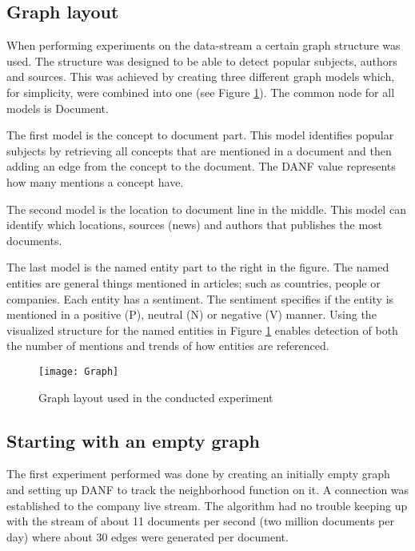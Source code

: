 \subsection{Graph layout}

When performing experiments on the data-stream a certain graph structure was used. The structure was designed to be able to detect popular subjects, authors and sources. This was achieved by creating three different graph models which, for simplicity, were combined into one (see Figure \ref{fig:experiment-graph}). The common node for all models is Document. 

The first model is the concept to document part. This model identifies popular subjects by retrieving all concepts that are mentioned in a document and then adding an edge from the concept to the document. The DANF value represents how many mentions a concept have. 

The second model is the location to document line in the middle. This model can identify which locations, sources (news) and authors that publishes the most documents.

The last model is the named entity part to the right in the figure. The named entities are general things mentioned in articles; such as countries, people or companies. Each entity has a sentiment. The sentiment specifies if the entity is mentioned in a positive (P), neutral (N) or negative (V) manner. Using the visualized structure for the named entities in Figure \ref{fig:experiment-graph} enables detection of both the number of mentions and trends of how entities are referenced.

\begin{figure}[h]
\centering
\texttt{[image: Graph]}    
\captionsetup{justification=centering}
\caption {Graph layout used in the conducted experiment}
\label{fig:experiment-graph}
\end{figure}


\subsection{Starting with an empty graph}

The first experiment performed was done by creating an initially empty graph and setting up DANF to track the neighborhood function on it. A connection was established to the company live stream. The algorithm had no trouble keeping up with the stream of about 11 documents per second (two million documents per day) where about 30 edges were generated per document. 

